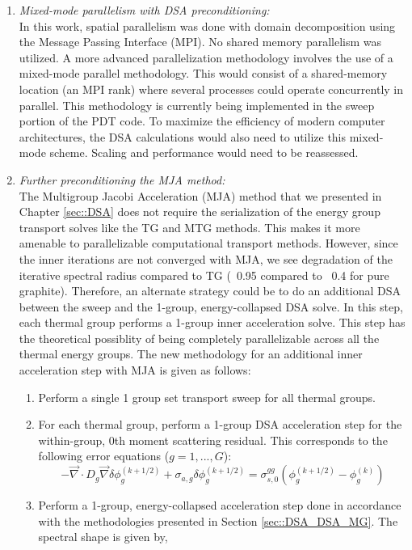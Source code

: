 \begin{enumerate}
\item {\em Mixed-mode parallelism with DSA preconditioning:} \\
In this work, spatial parallelism was done with domain decomposition using the Message Passing Interface (MPI). No shared memory parallelism was utilized. A more advanced parallelization methodology involves the use of a mixed-mode parallel methodology. This would consist of a shared-memory location (an MPI rank) where several processes could operate concurrently in parallel. This methodology is currently being implemented in the sweep portion of the PDT code. To maximize the efficiency of modern computer architectures, the DSA calculations would also need to utilize this mixed-mode scheme. Scaling and performance would need to be reassessed.
\iffalse
\item {\em Further preconditioning the MJA method:} \\
The Multigroup Jacobi Acceleration (MJA) method that we presented in Chapter \ref{sec::DSA} does not require the serialization of the energy group transport solves like the TG and MTG methods. This makes it more amenable to parallelizable computational transport methods. However, since the inner iterations are not converged with MJA, we see degradation of the iterative spectral radius compared to TG (~0.95 compared to ~0.4 for pure graphite). Therefore, an alternate strategy could be to do an additional DSA between the sweep and the 1-group, energy-collapsed DSA solve. In this step, each thermal group performs a 1-group inner acceleration solve. This step has the theoretical possiblity of being completely parallelizable across all the thermal energy groups. The new methodology for an additional inner acceleration step with MJA is given as follows:
	\begin{enumerate}
	\item Perform a single 1 group set transport sweep for all thermal groups.
	\item For each thermal group, perform a 1-group DSA acceleration step for the within-group, 0th moment scattering residual. This corresponds to the following error equations ($g=1,...,G$):
	        \begin{equation*}
	        -\vec{\nabla} \cdot D_g \vec{\nabla} \delta \phi_g^{(k+1/2)} + \sigma_{a,g} \delta \phi_g^{(k+1/2)} = \sigma_{s,0}^{gg} \left( \phi_g^{(k+1/2)} - \phi_g^{(k)}\right)
	        \end{equation*}
	\item Perform a 1-group, energy-collapsed acceleration step done in accordance with the methodologies presented in Section \ref{sec::DSA_DSA_MG}. The spectral shape is given by,

\end{enumerate}
\end{enumerate}
